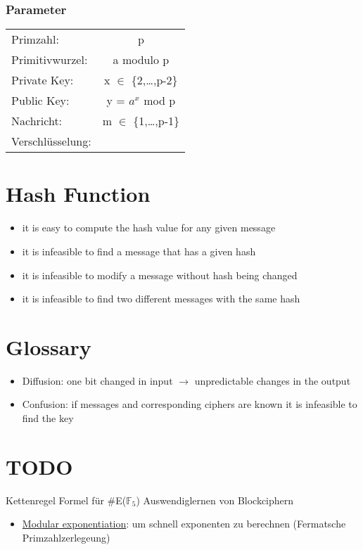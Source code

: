 \documentclass[a4paper]{article}
\begin{document}
\subsubsection{Parameter}

\begin{table}[h]
	\centering
	\begin{tabular}{lc}
	Primzahl: & p\\

	Primitivwurzel: & a modulo p \\

	Private Key: & x $\in$ \{2,\dots,p-2\} \\

	Public Key: & y = $a^x$ mod p \\

	Nachricht: & m $\in$ \{1,\dots,p-1\} \\

	Verschlüsselung:


	\end{tabular}
\end{table}

\section{Hash Function}
\begin{itemize}
    \item it is easy to compute the hash value for any given message
    \item it is infeasible to find a message that has a given hash
    \item it is infeasible to modify a message without hash being changed
    \item it is infeasible to find two different messages with the same hash
\end{itemize}

\section{Glossary}
\begin{itemize}
    \item Diffusion: one bit changed in input $\rightarrow$ unpredictable changes in the output
    \item Confusion: if messages and corresponding ciphers are known it is infeasible to find the key
\end{itemize}

\section{TODO}
Kettenregel
Formel für #E($\mathbb{F}_5$)
Auswendiglernen von Blockciphern


\begin{itemize}
    \item \href{http://en.wikipedia.org/wiki/Modular_exponentiation}{Modular exponentiation}: um schnell exponenten zu berechnen (Fermatsche Primzahlzerlegeung) 
\end{itemize}
\end{document}
